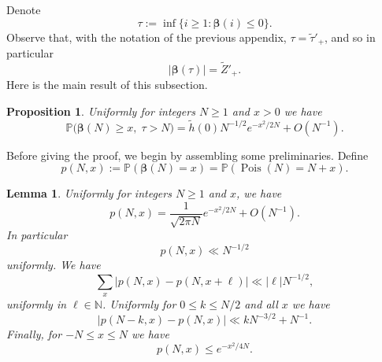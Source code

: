 \documentclass[11pt,reqno]{amsart}
\numberwithin{equation}{section}
\newtheorem{proposition}[theorem]{Proposition}
\newtheorem{lemma}[theorem]{Lemma}
\theoremstyle{definition}
\theoremstyle{remark}
\newcommand{\mb}{\mathbb}
\newcommand\Pois{\operatorname{Pois}}
\def\boldbeta{\boldsymbol\beta}
\renewcommand{\le}{\leqslant}
\renewcommand{\ge}{\geqslant}
\newcommand\N{\mathbb{N}}
\begin{document}
Denote 
\begin{equation}\label{tau-ladder-def} \tau := \inf \{i \ge 1 : \boldbeta(i) \le 0\}.\end{equation}
Observe that, with the notation of the previous appendix, $\tau = \tilde \tau'_+$, and so in particular
\begin{equation} \label{boldbeta-tau} |\boldbeta(\tau)| = \tilde Z'_+.\end{equation}
Here is the main result of this subsection.
\begin{proposition}\label{berry-esseen-prop} 
Uniformly for integers $N \ge 1$ and $x > 0$ we have
\[ \mb{P}\big(\boldbeta(N) \ge x, \;\tau > N\big) = \tilde{h}(0) N^{-1/2} e^{-x^2/2N} + O(N^{-1}).\]
\end{proposition}
Before giving the proof, we begin by assembling some preliminaries. Define
\begin{equation}\label{pnx-def} p(N, x) := \mb{P}(\boldbeta(N) = x) = \mb{P}(\Pois(N) = N + x).\end{equation}
\begin{lemma}
Uniformly for integers $N \ge 1$ and $x$, we have
\begin{equation}\label{loc-limit} p(N,x) =  \frac{1}{\sqrt{2\pi N}} e^{-x^2/2N} + O(N^{-1}).\end{equation} In particular
\begin{equation}\label{p-pointwise} p(N,x) \ll N^{-1/2}\end{equation} uniformly.
We have
\begin{equation}\label{poiss-der-1} \sum_x \big|p(N , x) - p(N , x + \ell)\big| \ll |\ell| N^{-1/2},\end{equation} uniformly in $\ell \in \N$.
Uniformly for $0 \le k \le N/2$ and all $x$ we have
\begin{equation}\label{pnk-ineq} \big| p(N - k, x) - p(N, x)\big| \ll k N^{-3/2} + N^{-1}.\end{equation}
Finally, for $-N \le x \le N$ we have
\begin{equation}\label{poisson-large-der} p(N, x) \le e^{-x^2/4N}.\end{equation}
\end{lemma}
\end{document}
